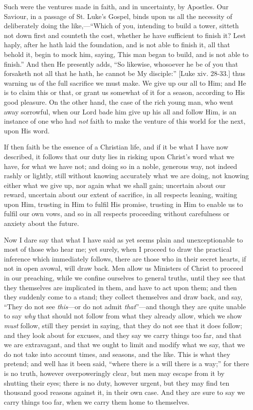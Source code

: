 Such were the ventures made in faith, and in uncertainty, by
Apostles. Our Saviour, in a passage of St. Luke's Gospel, binds upon
us all the necessity of deliberately doing the like,—``Which of
you, intending to build a tower, sitteth not down first and counteth
the cost, whether he have sufficient to finish it? Lest haply, after
he hath laid the foundation, and is not able to finish it, all that
behold it, begin to mock him, saying, This man began to build, and is
not able to finish.'' And then He presently adds, ``So
likewise, whosoever he be of you that forsaketh not all that he hath,
he cannot be My disciple:'' [Luke xiv. 28-33.] thus warning us of
the full sacrifice we must make. We give up our all to Him; and He is
to claim this or that, or grant us somewhat of it for a season,
according to His good pleasure. On the other hand, the case of the
rich young man, who went away sorrowful, when our Lord bade him give
up his all and follow Him, is an instance of one who had \emph{not}
faith to make the venture of this world for the next, upon His word.

If then faith be the essence of a Christian life, and if it be what
I have now described, it follows that our duty lies in risking upon
Christ's word what we have, for what we have not; and doing so in a
noble, generous way, not indeed rashly or lightly, still without
knowing accurately what we are doing, not knowing either what we give
up, nor again what we shall gain; uncertain about our reward,
uncertain about our extent of sacrifice, in all respects leaning,
waiting upon Him, trusting in Him to fulfil His promise, trusting in
Him to enable us to fulfil our own vows, and so in all respects
proceeding without carefulness or anxiety about the future.

Now I dare say that what I have said as yet seems plain and
unexceptionable to most of those who hear me; yet surely, when I
proceed to draw the practical inference which immediately follows,
there are those who in their secret hearts, if not in open avowal,
will draw back. Men allow us Ministers of Christ to proceed in our
preaching, while we confine ourselves to general truths, until they
see that they themselves are implicated in them, and have to act upon
them; and then they suddenly come to a stand; they collect themselves
and draw back, and say, ``They do not see \emph{this}—or do not
admit \emph{that}''—and though they are quite unable to say \emph{why}
that should not follow from what they already allow, which we show \emph{must}
follow, still they persist in saying, that they do not see that it
does follow; and they look about for excuses, and they say we carry
things too far, and that we are extravagant, and that we ought to
limit and modify what we say, that we do not take into account times,
and seasons, and the like. This is what they pretend; and well has it
been said, ``where there is a will there is a way;'' for there
is no truth, however overpoweringly clear, but men may escape from it
by shutting their eyes; there is no duty, however urgent, but they may
find ten thousand good reasons against it, in their own case. And they
are sure to say we carry things too far, when we carry them home to
themselves.

